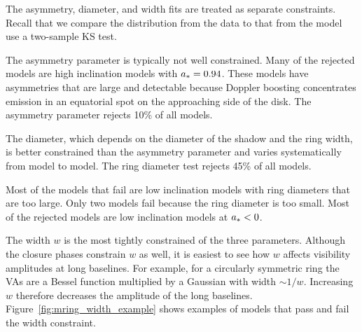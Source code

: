 The \mring asymmetry, diameter, and width fits are treated as separate constraints.
Recall that we compare the distribution from the data to that from the model use a two-sample KS test.

The asymmetry parameter is typically not well constrained.
Many of the rejected models are high inclination models with $a_* =0.94$.
These models have asymmetries that are large and detectable because Doppler boosting concentrates emission in an equatorial spot on the approaching side of the disk.
The asymmetry parameter rejects 10\% of all models.

The \mring diameter, which depends on the diameter of the shadow and the ring width, is better constrained than the asymmetry parameter and varies systematically from model to model.  %
The ring diameter test rejects 45\% of all models.

Most of the models that fail are low inclination models with ring diameters that are too large. Only two \bhac models fail because the ring diameter is too small.  Most of the rejected models are low inclination models at $a_* < 0$.  


The \mring width $w$ is the most tightly constrained of the three \mring parameters.
Although the closure phases constrain $w$ as well, it is easiest to see how $w$ affects visibility amplitudes at long baselines.
For example, for a circularly symmetric ring the VAs are a Bessel function multiplied by a Gaussian with width $\sim 1/w$.  Increasing $w$ therefore decreases the amplitude of the long baselines.
Figure~\ref{fig:mring_width_example} shows examples of models that pass and fail the \mring width constraint.

